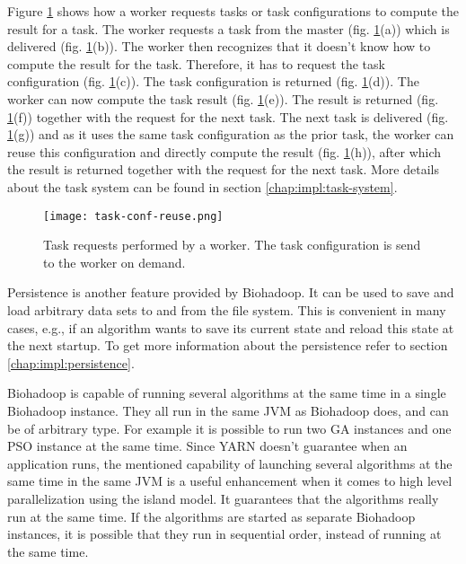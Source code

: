 Figure \ref{fig:task-conf-reuse} shows how a worker requests tasks or task configurations to compute the result for a task. The worker requests a task from the master (fig. \ref{fig:task-conf-reuse}(a)) which is delivered (fig. \ref{fig:task-conf-reuse}(b)). The worker then recognizes that it doesn't know how to compute the result for the task. Therefore, it has to request the task configuration (fig. \ref{fig:task-conf-reuse}(c)). The task configuration is returned (fig. \ref{fig:task-conf-reuse}(d)). The worker can now compute the task result (fig. \ref{fig:task-conf-reuse}(e)). The result is returned (fig. \ref{fig:task-conf-reuse}(f)) together with the request for the next task. The next task is delivered (fig. \ref{fig:task-conf-reuse}(g)) and as it uses the same task configuration as the prior task, the worker can reuse this configuration and directly compute the result (fig. \ref{fig:task-conf-reuse}(h)), after which the result is returned together with the request for the next task. More details about the task system can be found in section \ref{chap:impl:task-system}.

\begin{figure}
  \centering
  \texttt{[image: task-conf-reuse.png]}
  \caption[Task requests performed by a worker]{Task requests performed by a worker. The task configuration is send to the worker on demand.}
  \label{fig:task-conf-reuse}
\end{figure}

Persistence is another feature provided by Biohadoop. It can be used to save and load arbitrary data sets to and from the file system. This is convenient in many cases, e.g., if an algorithm wants to save its current state and reload this state at the next startup. To get more information about the persistence refer to section \ref{chap:impl:persistence}.

Biohadoop is capable of running several algorithms at the same time in a single Biohadoop instance. They all run in the same JVM as Biohadoop does, and can be of arbitrary type. For example it is possible to run two GA instances and one PSO instance at the same time. Since YARN doesn't guarantee when an application runs, the mentioned capability of launching several algorithms at the same time in the same JVM is a useful enhancement when it comes to high level parallelization using the island model. It guarantees that the algorithms really run at the same time. If the algorithms are started as separate Biohadoop instances, it is possible that they run in sequential order, instead of running at the same time.

